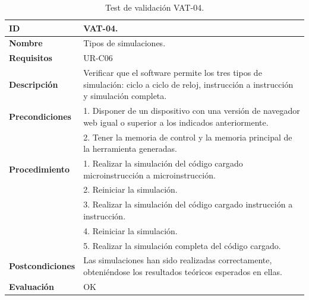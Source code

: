 \begin{center}
\begin{table}[htb]
\centering
\caption{Test de validación VAT-04.}
\begin{tabular}{@{}p{2.5cm} p{9cm}@{}} 
\toprule
\textbf{ID} 					& VAT-04. \\
\midrule
\textbf{Nombre} 				& Tipos de simulaciones. \\
\midrule
\textbf{Requisitos} 		& UR-C06\\
\midrule
\textbf{Descripción} 		& Verificar que el \gls{software} permite los tres tipos de simulación: ciclo a ciclo de reloj, instrucción a instrucción y simulación completa. \\
\midrule
\textbf{Precondiciones}		& 1. Disponer de un dispositivo con una versión de navegador web igual o superior a los indicados anteriormente. \\
											& 2. Tener la memoria de control y la memoria principal de la herramienta generadas. \\
\midrule
\textbf{Procedimiento}		& 1. Realizar la simulación del código cargado microinstrucción a microinstrucción.\\
											& 2. Reiniciar la simulación.\\
											& 3. Realizar la simulación del código cargado instrucción a instrucción.\\
											& 4. Reiniciar la simulación.\\
											& 5. Realizar la simulación completa del código cargado. \\
\midrule
\textbf{Postcondiciones} 		&  Las simulaciones han sido realizadas correctamente, obteniéndose los resultados teóricos esperados en ellas.\\
\midrule
\textbf{Evaluación} 			& OK \\
\bottomrule
\end{tabular}
\label{tab:vat-04}
\end{table}
\end{center}

